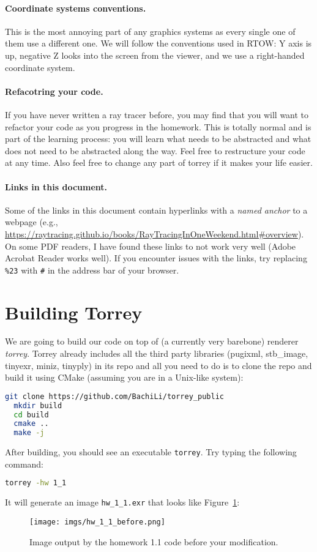 \paragraph{Coordinate systems conventions.} This is the most annoying part of any graphics systems as every single one of them use a different one. We will follow the conventions used in RTOW: Y axis is up, negative Z looks into the screen from the viewer, and we use a right-handed coordinate system.

\paragraph{Refacotring your code.} If you have never written a ray tracer before, you may find that you will want to refactor your code as you progress in the homework. This is totally normal and is part of the learning process: you will learn what needs to be abstracted and what does not need to be abstracted along the way. Feel free to restructure your code at any time. Also feel free to change any part of torrey if it makes your life easier.

\paragraph{Links in this document.} Some of the links in this document contain hyperlinks with a \emph{named anchor} to a webpage (e.g., \url{https://raytracing.github.io/books/RayTracingInOneWeekend.html\#overview}). On some PDF readers, I have found these links to not work very well (Adobe Acrobat Reader works well). If you encounter issues with the links, try replacing \lstinline{%23} with \lstinline{#} in the address bar of your browser.

\section{Building Torrey}
We are going to build our code on top of (a currently very barebone) renderer \emph{torrey}. Torrey already includes all the third party libraries (pugixml, stb\_image, tinyexr, miniz, tinyply) in its repo and all you need to do is to clone the repo and build it using CMake (assuming you are in a Unix-like system):
\begin{lstlisting}[language=bash]
  git clone https://github.com/BachiLi/torrey_public
  mkdir build
  cd build
  cmake ..
  make -j
\end{lstlisting}

After building, you should see an executable \lstinline{torrey}. Try typing the following command:
\begin{lstlisting}[language=bash]
  torrey -hw 1_1
\end{lstlisting}
It will generate an image \lstinline{hw_1_1.exr} that looks like Figure~\ref{fig:hw_1_1_before}:
\begin{figure}[ht]
    \centering
    \texttt{[image: imgs/hw\_1\_1\_before.png]}
    \caption{Image output by the homework 1.1 code before your modification.}
    \label{fig:hw_1_1_before}
\end{figure}


